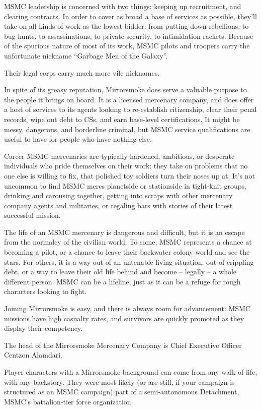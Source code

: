MSMC leadership is concerned with two things: keeping up recruitment, and clearing contracts.
In order to cover as broad a base of services as possible, they’ll take on all kinds of work as the
lowest bidder: from putting down rebellions, to bug hunts, to assassinations, to private security,
to intimidation rackets. Because of the spurious nature of most of its work, MSMC pilots and
troopers carry the unfortunate nickname “Garbage Men of the Galaxy”.

Their legal corps carry much more vile nicknames.

In spite of its greasy reputation, Mirrorsmoke does serve a valuable purpose to the people it
brings on board. It is a licensed mercenary company, and does offer a host of services to its
agents looking to re-establish citizenship, clear their penal records, wipe out debt to CSs, and
earn base-level certifications. It might be messy, dangerous, and borderline criminal, but MSMC
service qualifications are useful to have for people who have nothing else.

Career MSMC mercenaries are typically hardened, ambitious, or desperate individuals who pride
themselves on their work: they take on problems that no one else is willing to fix, that polished
toy soldiers turn their noses up at. It’s not uncommon to find MSMC mercs planetside or
stationside in tight-knit groups, drinking and carousing together, getting into scraps with other
mercenary company agents and militaries, or regaling bars with stories of their latest successful
mission.

The life of an MSMC mercenary is dangerous and difficult, but it is an escape from the normalcy
of the civilian world. To some, MSMC represents a chance at becoming a pilot, or a chance to
leave their backwater colony world and see the stars. For others, it is a way out of an untenable
living situation, out of crippling debt, or a way to leave their old life behind and become -- legally
-- a whole different person. MSMC can be a lifeline, just as it can be a refuge for rough
characters looking to fight.

Joining Mirrorsmoke is easy, and there is always room for advancement: MSMC missions have
high casualty rates, and survivors are quickly promoted as they display their competency.

The head of the Mirrorsmoke Mercenary Company is Chief Executive Officer Centzon Alamdari.

Player characters with a Mirrorsmoke background can come from any walk of life, with any
backstory. They were most likely (or are still, if your campaign is structured as an MSMC
campaign) part of a semi-autonomous Detachment, MSMC’s battalion-tier force organization.

